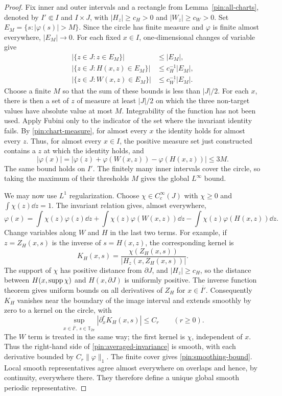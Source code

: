 \begin{proof}
Fix inner and outer intervals and a rectangle from
Lemma~\ref{pin:all-charts}, denoted by $I'\Subset I$ and $I\times J$,
with $|H_z|\ge c_H>0$ and $|W_z|\ge c_W>0$. Set
$E_M=\{s:|\varphi(s)|>M\}$. Since the circle has finite measure and
$\varphi$ is finite almost everywhere, $|E_M|\to0$. For each fixed
$x\in I$, one-dimensional changes of variable give
\begin{align*}
 |\{z\in J:z\in E_M\}|&\le |E_M|,\\
 |\{z\in J:H(x,z)\in E_M\}|&\le c_H^{-1}|E_M|,\\
 |\{z\in J:W(x,z)\in E_M\}|&\le c_W^{-1}|E_M|.
\end{align*}
Choose a finite $M$ so that the sum of these bounds is less than
$|J|/2$. For each $x$, there is then a set of $z$ of measure at least
$|J|/2$ on which the three non-target values have absolute value at
most $M$. Integrability of the function has not been used. Apply Fubini
only to the indicator of the set where the invariant identity fails.
By \eqref{pin:chart-measure}, for almost every $x$ the identity holds
for almost every $z$. Thus, for almost every $x\in I$, the positive
measure set just constructed contains a $z$ at which the identity
holds, and
\[
       |\varphi(x)|
       =|\varphi(z)+\varphi(W(x,z))-\varphi(H(x,z))|\le3M.
\]
The same bound holds on $I'$. The finitely many inner intervals cover
the circle, so taking the maximum of their thresholds $M$ gives the
global $L^\infty$ bound.

We may now use $L^1$ regularization. Choose
$\chi\in C_c^\infty(J)$ with $\chi\ge0$ and
$\int\chi(z)\dd z=1$. The invariant relation gives, almost everywhere,
\begin{equation}
 \varphi(x)=\int\chi(z)\varphi(z)\dd z
   +\int\chi(z)\varphi(W(x,z))\dd z
   -\int\chi(z)\varphi(H(x,z))\dd z.
 \label{pin:averaged-invariance}
\end{equation}
Change variables along $W$ and $H$ in the last two terms. For example,
if $z=Z_H(x,s)$ is the inverse of $s=H(x,z)$, the corresponding
kernel is
\[
             K_H(x,s)=
             \frac{\chi(Z_H(x,s))}{|H_z(x,Z_H(x,s))|}.
\]
The support of $\chi$ has positive distance from $\partial J$, and
$|H_z|\ge c_H$, so the distance between $H(x,\operatorname{supp}\chi)$ and
$H(x,\partial J)$ is uniformly positive. The inverse function theorem
gives uniform bounds on all derivatives of $Z_H$ for
$x\in\overline{I'}$. Consequently $K_H$ vanishes near the boundary
of the image interval and extends smoothly by zero to a kernel on the
circle, with
\[
 \sup_{x\in\overline{I'},\,s\in\mathbb T_{2\pi}}
       |\partial_x^r K_H(x,s)|\le C_r\qquad(r\ge0).
\]
The $W$ term is treated in the same way; the first kernel is $\chi$,
independent of $x$. Thus the right-hand side of
\eqref{pin:averaged-invariance} is smooth, with each derivative bounded
by $C_r\|\varphi\|_1$. The finite cover gives
\eqref{pin:smoothing-bound}. Local smooth representatives agree almost
everywhere on overlaps and hence, by continuity, everywhere there.
They therefore define a unique global smooth periodic representative.


\end{proof}
